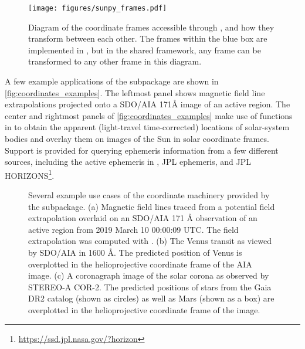 \begin{figure}
    \centering
    \texttt{[image: figures/sunpy\_frames.pdf]}
    \caption{Diagram of the coordinate frames accessible through , and how they transform between each other.
    The frames within the blue box are implemented in , but in the shared framework, any frame can be transformed to any other frame in this diagram.}
    \label{fig:transform_graph}
\end{figure}

A few example applications of the  subpackage are shown in \autoref{fig:coordinates_examples}.
The leftmost panel shows magnetic field line extrapolations projected onto a SDO/AIA 171\AA{} image of an active region.
The center and rightmost panels of \autoref{fig:coordinates_examples} make use of functions in  to obtain the apparent (light-travel time-corrected) locations of solar-system bodies and overlay them on images of the Sun in solar coordinate frames.
Support is  provided for querying ephemeris information from a few different sources, including the active ephemeris in , JPL ephemeris, and JPL HORIZONS\footnote{\url{https://ssd.jpl.nasa.gov/?horizon}}.

\begin{figure}
    \caption{Several example use cases of the coordinate machinery provided by the  subpackage.
    (a) Magnetic field lines traced from a potential field extrapolation overlaid on an SDO/AIA 171 \AA{} observation of an active region from 2019 March 10 00:00:09 UTC.
    The field extrapolation was computed with  \citep{david_stansby_2019_3237053}.
    (b) The Venus transit as viewed by SDO/AIA in 1600 \AA. The predicted position of Venus is overplotted in the helioprojective coordinate frame of the AIA image.
    (c) A coronagraph image of the solar corona as observed by STEREO-A COR-2. The predicted positions of stars from the Gaia DR2 catalog (shown as circles) as well as Mars (shown as a box) are overplotted in the helioprojective coordinate frame of the image.}
    \label{fig:coordinates_examples}
\end{figure}
